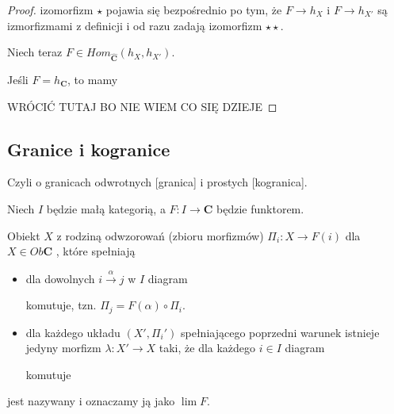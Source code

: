 \begin{proof}
  izomorfizm $\star$ pojawia się bezpośrednio po tym, że $F\to h_X$ i $F\to h_{X'}$ są izmorfizmami z definicji i od razu zadają izomorfizm $\star\star$.

  Niech teraz $F\in Hom_{\mathbf{\hat{C}}}(h_X,h_{X'})$.

  Jeśli $F=h_{\mathbf{C}}$, to mamy
  \begin{center}\end{center}

  {\large\color{red}WRÓCIĆ TUTAJ BO NIE WIEM CO SIĘ DZIEJE}

\end{proof}

\subsection{Granice i kogranice}

Czyli o granicach odwrotnych [granica] i prostych [kogranica].

Niech $I$ będzie małą kategorią, a $F:I\to\mathbf{C}$ będzie funktorem.

\begin{definition}
  Obiekt $X$ z rodziną odwzorowań (zbioru morfizmów) $\Pi_i:X\to F(i)$ dla $X\in Ob\mathbf{C}$ , które spełniają
  \begin{itemize}
    \item \acc{[zgodność]} dla dowolnych $i\xrightarrow{\alpha}j$ w $I$ diagram
      \begin{center}\end{center}
      komutuje, tzn. $\Pi_j=F(\alpha)\circ\Pi_i$.
    \item \acc{[uniwersalność]} dla każdego układu $(X',\Pi_i')$ spełniającego poprzedni warunek istnieje jedyny morfizm $\lambda:X'\to X$ taki, że dla każdego $i\in I$ diagram
      \begin{center}\end{center}
    komutuje
  \end{itemize}
  jest nazywany  i oznaczamy ją jako $\lim F$.
\end{definition}

